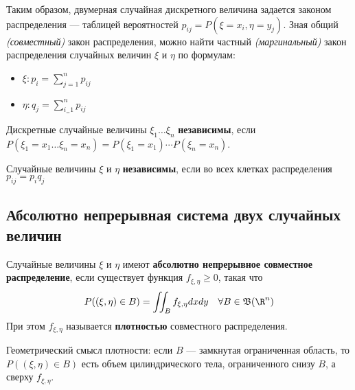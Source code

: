 Таким образом, двумерная случайная дискретного величина задается законом распределения --- таблицей вероятностей \(p_{ij} = P(\xi = x_i, \eta = y_j)\). Зная общий \textit{(совместный)} закон распределения, можно найти частный \textit{(маргинальный)} закон распределения случайных величин \(\xi\) и \(\eta\) по формулам:
\begin{itemize}
    \item \(\xi : p_i = \sum_{j = 1}^n p_{ij}\)
    \item \(\eta : q_j = \sum_{i_ = 1}^n p_{ij}\)
\end{itemize}

\begin{definition}
    Дискретные случайные величины \(\xi_1 \dots \xi_n\) \textbf{независимы}, если \(P(\xi_1 = x_1 \dots \xi_n = x_n) = P(\xi_1 = x_1) \cdots P(\xi_n = x_n)\).
\end{definition}

\begin{definition}
    Случайные величины \(\xi\) и \(\eta\) \textbf{независимы}, если во всех клетках распределения \(p_{ij} = p_i q_j\)
\end{definition}

\begin{example}
    \unfinished
\end{example}

\subsection{Абсолютно непрерывная система двух случайных величин}

\begin{definition}
    Случайные величины \(\xi\) и \(\eta\) имеют \textbf{абсолютно непрерывное совместное распределение}, если существует функция \(f_{\xi, \eta} \geq 0\), такая что
    \[P((\xi, \eta) \in B) = \iint_B f_{\xi, \eta} dx dy \quad \forall B \in \mathfrak{B}(\R^n)\]
    При этом \(f_{\xi, \eta}\) называется \textbf{плотностью} совместного распределения.
\end{definition}

Геометрический смысл плотности: если \(B\) --- замкнутая ограниченная область, то \(P((\xi, \eta) \in B)\) есть объем цилиндрического тела, ограниченного снизу \(B\), а сверху \(f_{\xi, \eta}\).

